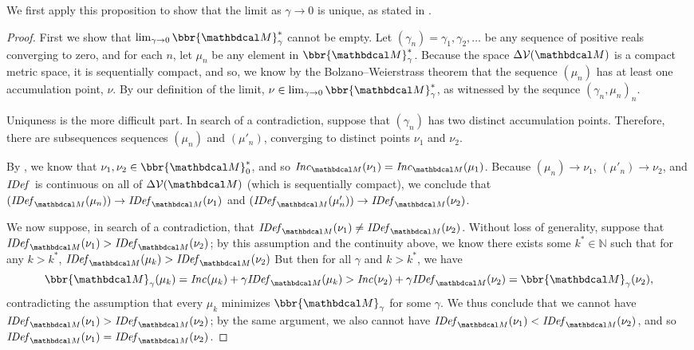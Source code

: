 We first apply this proposition to show that the limit as $\gamma \to 0$ is unique, as stated in .
\begin{proof}
First we show that $\lim_{\gamma \to 0}\bbr{\dg M}_\gamma^*$ cannot be empty.
Let $(\gamma_n) = \gamma_1, \gamma_2, \ldots$ be any sequence of positive reals
converging to zero, and for each $n$, let $\mu_n$ be any element in $\bbr{\dg
M}_\gamma^*$. Because the space $\Delta\V(\dg M)$ is a compact metric space, it is sequentially compact, and so, we know by the
Bolzano–Weierstrass theorem that the sequence $(\mu_n)$ has at least one
accumulation point, $\nu$. By our definition of the limit, $\nu \in
\lim_{\gamma\to0}\bbr{\dg M}_\gamma^*$, as witnessed by the sequnce $(\gamma_n, \mu_n)_n$.

Uniquness is the more difficult part. In search of a contradiction, suppose that
$(\gamma_n)$ has two distinct accumulation points. Therefore, there are
subsequences sequences $(\mu_n)$ and $(\mu'_n)$, converging to distinct points
$\nu_1$ and $\nu_2$. 

By , we know that $\nu_1, \nu_2 \in \bbr{\dg M}_0^*$, and so $\Inc_{\dg M}(\nu_1) = \Inc_{\dg M}(\mu_1)$. 
Because  $(\mu_n) \to \nu_1$, $(\mu'_n) \to \nu_2$, and $\mathit{IDef}_{}$ is continuous on all of $\Delta\V(\dg M)$ (which is sequentially compact), we conclude that 
$(\IDef{\dg M}(\mu_n))\to \IDef{\dg M}(\nu_1)$ and
$(\IDef{\dg M}(\mu_n'))\to \IDef{\dg M}(\nu_2)$.

We now suppose, in search of a contradiction, that $\IDef{\dg M}(\nu_1) \neq \IDef{\dg M}(\nu_2)$. Without loss of generality, suppose that $\IDef{\dg M}(\nu_1) > \IDef{\dg M}(\nu_2)$; by this assumption and the continuity above, we know there exists some $k^* \in \mathbb N$ such that for any $k > k^*$, 
$ \IDef{\dg M}(\mu_k) >  \IDef{\dg M}(\nu_2) $
But then for all $\gamma$ and $k > k^*$, we have 
\[ \bbr{\dg M}_\gamma(\mu_k) = \Inc(\mu_k) + \gamma\IDef{\dg M}(\mu_k) > \Inc(\nu_2) 
+ \gamma \IDef{\dg M}(\nu_2) = \bbr{\dg M}_\gamma(\nu_2),\]
contradicting the assumption that every $\mu_k$ minimizes
$\bbr{\dg M}_\gamma$ for some $\gamma$. We thus conclude that we cannot have $\IDef{\dg M}(\nu_1) > \IDef{\dg M}(\nu_2)$; by the same argument, we also cannot have $\IDef{\dg M}(\nu_1) < \IDef{\dg M}(\nu_2)$, and so $\IDef{\dg M}(\nu_1) =\IDef{\dg M}(\nu_2)$. 


\end{proof}
